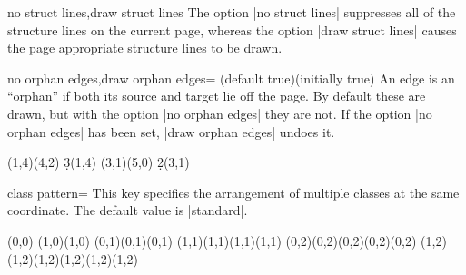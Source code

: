 \documentclass{ltxdoc}
\begin{document}
\begin{sseqdata}[name=ex1,degree={#1}{1-#1}]
\begin{keylist}{no struct lines,draw struct lines}
The option |no struct lines| suppresses all of the structure lines on the current page, whereas the option |draw struct lines| causes the page appropriate structure lines to be drawn.
\end{keylist}

\begin{keylist}{no orphan edges,draw orphan edges= (default true)(initially true)}
An edge is an ``orphan'' if both its source and target lie off the page. By default these are drawn, but with the option |no orphan edges| they are not. If the option |no orphan edges| has been set, |draw orphan edges| undoes it.
\begin{codeexample}[]
\begin{sseqdata}[name=orphan edges example,cohomological Serre grading,
                x range={0}{3}, y range={0}{3}]
\class(1,4)\class(4,2)
\d3(1,4)
\class(3,1)\class(5,0)
\d2(3,1)
\end{sseqdata}
\printpage[name=orphan edges example]
\hskip1cm
\printpage[name=orphan edges example,no orphan edges]
\end{codeexample}
\end{keylist}


\begin{key}{class pattern=}
This key specifies the arrangement of multiple classes at the same coordinate. The default value is |standard|.
\begin{codeexample}[]
\begin{sseqdata}[name=class pattern example,no axes,ymirror]
\class(0,0)
\class(1,0)\class(1,0)
\class(0,1)\class(0,1)\class(0,1)
\class(1,1)\class(1,1)\class(1,1)\class(1,1)
\class(0,2)\class(0,2)\class(0,2)\class(0,2)\class(0,2)
\class(1,2)\class(1,2)\class(1,2)\class(1,2)\class(1,2)\class(1,2)
\end{sseqdata}

\printpage[name=class pattern example, class pattern=standard]
\printpage[name=class pattern example, change classes=blue,
           class pattern=linear, class placement transform={rotate=45}]
\end{codeexample}


\end{key}
\end{sseqdata}
\end{document}
